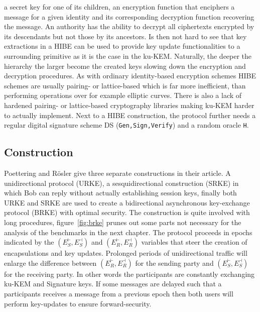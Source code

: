 \documentclass[11pt,a4paper,twoside,openright,bibliography=totoc]{scrbook}
\begin{document}
a secret key for one of its children, an encryption
function that enciphers a message for a given identity and
its corresponding decryption function recovering the message.
An authority has the ability to decrypt all ciphertexts
encrypted by its descendants but not those by its ancestors.
Is then not hard to see that key extractions in a HIBE
can be used to provide key update functionalities to
a surrounding primitive as it is the case in the ku-KEM.
Naturally, the deeper the hierarchy the larger become the
created keys slowing down the encryption and decryption procedures.
As with ordinary identity-based encryption schemes HIBE schemes are usually
pairing- or lattice-based which is far more inefficient,
than performing operations over for example elliptic curves.
There is also a lack of hardened pairing- or lattice-based
cryptography libraries making ku-KEM harder to actually
implement.
Next to a HIBE construction, the protocol further needs a regular digital
signature scheme DS (\texttt{Gen,Sign,Verify}) and a random oracle \texttt{H}.

\subsection{Construction}
\label{sec:construction}

Poettering and Rösler give three separate constructions in their article.
A unidirectional protocol (URKE), a sesquidirectional construction (SRKE) in which
Bob can reply without actually establishing session keys, finally both URKE and SRKE
are used to create a bidirectional asynchronous key-exchange protocol (BRKE)
with optimal security. The construction is quite involved with long
procedures, figure~\ref{fig:brke} prunes out some parts not necessary for the
analysis of the benchmarks in the next chapter. The protocol proceeds
in epochs indicated by the $(E_S^\vdash,E_S^\dashv)$ and $(E_R^\vdash,E_R^\dashv)$
variables that steer the creation of encapsulations and key updates.
Prolonged periods of unidirectional traffic will enlarge the
difference between $(E_R^\vdash,E_R^\dashv)$ for the sending
party and $(E_S^\vdash,E_S^\dashv)$ for the receiving party.
In other words the participants are constantly exchanging
ku-KEM and Signature keys. If some messages are delayed such
that a participants receives a message from a previous epoch
then both users will perform key-updates to ensure forward-security.
\end{document}
